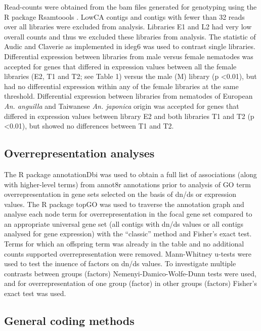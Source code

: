 \documentclass[10pt]{bmc_article}
\newenvironment{bmcformat}{\begin{raggedright}\baselineskip20pt\sloppy\setboolean{publ}{false}}{\end{raggedright}\baselineskip20pt\sloppy}
\begin{document}
\begin{bmcformat}
Read-counts were obtained from the bam files generated for genotyping
using the R package Rsamtoools \cite{rsamtools}. LowCA contigs and
contigs with fewer than 32 reads over all libraries were excluded from
analysis. Libraries E1 and L2 had very low overall counts and thus we
excluded these libraries from analysis. The statistic of Audic and
Claverie \cite{pmid9331369} as implemented in ideg6
\cite{pmid12429865} was used to contrast single
libraries. Differential expression between libraries from male versus
female nematodes was accepted for genes that differed in expression
values between all the female libraries (E2, T1 and T2; see Table 1)
versus the male (M) library (p <0.01), but had no differential
expression within any of the female libraries at the same
threshold. Differential expression between libraries from nematodes of
European \textit{An. anguilla} and Taiwanese \textit{An. japonica}
origin was accepted for genes that differed in expression values
between library E2 and both libraries T1 and T2 (p <0.01), but showed
no differences between T1 and T2.

\subsection*{Overrepresentation analyses}

The R package annotationDbi \cite{AnnotationDbi} was used to obtain a
full list of associations (along with higher-level terms) from annot8r
annotations prior to analysis of GO term overrepresentation in gene
sets selected on the basis of dn/ds or expression values. The
R package topGO \cite{topGO} was used to traverse the annotation graph
and analyse each node term for overrepresentation in the focal gene
set compared to an appropriate universal gene set (all contigs with
dn/ds values or all contigs analysed for gene expression) with the
``classic'' method and Fisher's exact test. Terms for which an
offspring term was already in the table and no additional counts
supported overrepresentation were removed. Mann-Whitney u-tests were
used to test the inuence of factors on dn/ds values. To investigate
multiple contrasts between groups (factors) Nemenyi-Damico-Wolfe-Dunn
tests were used, and for overrepresentation of one group (factor) in
other groups (factors) Fisher's exact test was used.

\subsection*{General coding methods}


\end{bmcformat}
\end{document}
